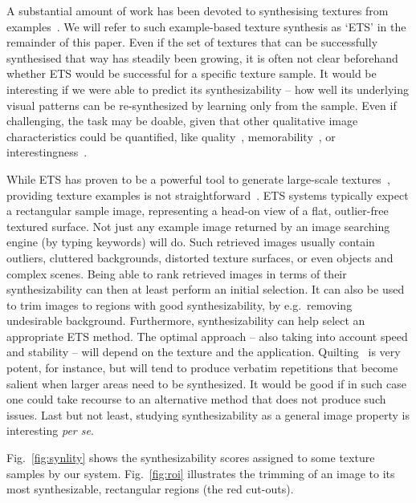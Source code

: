 \documentclass[10pt,twocolumn,letterpaper]{article}
\begin{document}
A substantial amount of work has been devoted to synthesising textures
from examples~\cite{Heeger:95,
  Portilla:2000:IJCV,Efros:sig2001,Kwatra:2003, Lefebvre:2005:sig,
  Ma:2011,dai:facade:iccv13}. We will refer to such example-based
texture synthesis as `ETS' in the remainder of this paper. Even if the
set of textures that can be successfully synthesised that way has
steadily been growing, it is often not clear beforehand whether ETS
would be successful for a specific texture sample. It would be
interesting if we were able to predict its synthesizability -- how
well its underlying visual patterns can be re-synthesized by learning
only from the sample. Even if challenging, the task may be doable,
given that other qualitative image characteristics could be
quantified, like quality~\cite{image:quality},
memorability~\cite{image:memorability}, or
interestingness~\cite{image:interestingness}.


While ETS has proven to be a powerful tool to generate large-scale
textures~\cite{WLKT09}, providing texture examples is not
straightforward~\cite{lockerman2013arxiv}. ETS systems typically
expect a rectangular sample image, representing a head-on view of a
flat, outlier-free textured surface. Not just any example image
returned by an image searching engine (by typing keywords) will do.
Such retrieved images usually contain outliers, cluttered backgrounds,
distorted texture surfaces, or even objects and complex scenes. Being
able to rank retrieved images in terms of their synthesizability can
then at least perform an initial selection. It can also be used to
trim images to regions with good synthesizability, by e.g.~removing
undesirable background. Furthermore, synthesizability can help select
an appropriate ETS method. The optimal approach -- also taking into
account speed and stability -- will depend on the texture and the
application. Quilting~\cite{Efros:sig2001} is very potent, for
instance, but will tend to produce verbatim repetitions that become
salient when larger areas need to be synthesized. It would be good if
in such case one could take recourse to an alternative method that
does not produce such issues. Last but not least, studying
synthesizability as a general image property is interesting {\em per
  se}.

Fig.~\ref{fig:synlity} shows the synthesizability scores assigned to some texture samples 
by our system. Fig.~\ref{fig:roi} illustrates the trimming of an image to its most
synthesizable, rectangular regions (the red cut-outs).
\end{document}
